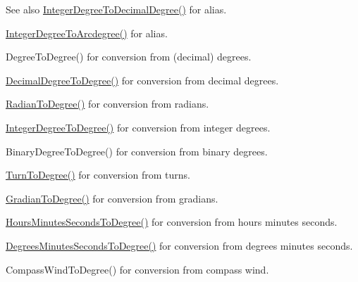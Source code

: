 \begin{DoxySeeAlso}{See also}
\mbox{\hyperlink{group___e_g_x_math-_angle_conversions-_integer_degree_gac219c3198508ba984d8d81d22831b27d}{Integer\+Degree\+To\+Decimal\+Degree()}} for alias. 

\mbox{\hyperlink{group___e_g_x_math-_angle_conversions-_integer_degree_gaf633d0b82bfb7586ce86ffbcf78d8f7a}{Integer\+Degree\+To\+Arcdegree()}} for alias. 

Degree\+To\+Degree() for conversion from (decimal) degrees. 

\mbox{\hyperlink{group___e_g_x_math-_angle_conversions-_decimal_degree_ga0aa7f2f5dbb00cf4ab303421c6e33ccf}{Decimal\+Degree\+To\+Degree()}} for conversion from decimal degrees. 

\mbox{\hyperlink{group___e_g_x_math-_angle_conversions-_radian_ga25bbce6cdc1c3621f2a158d320e3bc45}{Radian\+To\+Degree()}} for conversion from radians. 

\mbox{\hyperlink{group___e_g_x_math-_angle_conversions-_integer_degree_gaa9b63c6095fd7f8809fcfa2ba1e62235}{Integer\+Degree\+To\+Degree()}} for conversion from integer degrees. 

Binary\+Degree\+To\+Degree() for conversion from binary degrees. 

\mbox{\hyperlink{group___e_g_x_math-_angle_conversions-_turn_ga19eceb6db54a1cf17789639c2a869cb9}{Turn\+To\+Degree()}} for conversion from turns. 

\mbox{\hyperlink{group___e_g_x_math-_angle_conversions-_gradian_gaa284952274f16d225951cf5139d0ff4e}{Gradian\+To\+Degree()}} for conversion from gradians. 

\mbox{\hyperlink{group___e_g_x_math-_angle_conversions-_hours_minutes_seconds_ga4f66698550a0cf0fd326f25aba2c0d80}{Hours\+Minutes\+Seconds\+To\+Degree()}} for conversion from hours minutes seconds. 

\mbox{\hyperlink{group___e_g_x_math-_angle_conversions-_degrees_minutes_seconds_gae59bfb37c0751e60e315f8a1ed3dc0cf}{Degrees\+Minutes\+Seconds\+To\+Degree()}} for conversion from degrees minutes seconds. 

Compass\+Wind\+To\+Degree() for conversion from compass wind. 
\end{DoxySeeAlso}
\mbox{\label{group___e_g_x_math-_angle_conversions-_integer_degree_ga204317877546ea6bbafe5ff558f55a16}} 
